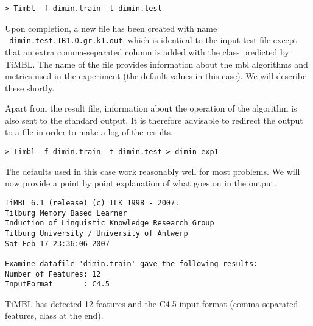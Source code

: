 \documentclass{report}
\begin{document}
{\footnotesize
\begin{verbatim}
> Timbl -f dimin.train -t dimin.test
\end{verbatim}
}

Upon completion, a new file has been created with name\\ {\small\tt
dimin.test.IB1.O.gr.k1.out}, which is identical to the
input test file except that an extra comma-separated column is added
with the class predicted by TiMBL. The name of the file provides
information about the {\sc mbl} algorithms and metrics used in the
experiment (the default values in this case). We will describe these
shortly.

Apart from the result file, information about the operation of the
algorithm is also sent to the standard output. It is therefore 
advisable to redirect the output to a file in order to make a log of
the results.

{\footnotesize
\begin{verbatim}
> Timbl -f dimin.train -t dimin.test > dimin-exp1
\end{verbatim}
}

The defaults used in this case work reasonably well for most problems.  We
will now provide a point by point explanation of what goes on in the
output.



{\footnotesize
\begin{verbatim}
TiMBL 6.1 (release) (c) ILK 1998 - 2007.
Tilburg Memory Based Learner
Induction of Linguistic Knowledge Research Group
Tilburg University / University of Antwerp
Sat Feb 17 23:36:06 2007

Examine datafile 'dimin.train' gave the following results:
Number of Features: 12
InputFormat       : C4.5
\end{verbatim}
}



TiMBL has detected 12 features and the C4.5 input format
(comma-separated features, class at the end).

\end{document}
